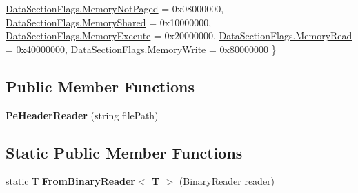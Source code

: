 \begin{DoxyCompactItemize}
\mbox{\hyperlink{class_p_e_d_scanner_lib_1_1_struct_1_1_pe_header_reader_aaa653fc9f63948e6fcdc31bc79e5aeffaf17f8f106acef3fd0ff47b8cca4de356}{Data\+Section\+Flags.\+Memory\+Not\+Paged}} = 0x08000000, 
\mbox{\hyperlink{class_p_e_d_scanner_lib_1_1_struct_1_1_pe_header_reader_aaa653fc9f63948e6fcdc31bc79e5aeffabfa33c37b72f766266c354cb6eb01d3a}{Data\+Section\+Flags.\+Memory\+Shared}} = 0x10000000, 
\mbox{\hyperlink{class_p_e_d_scanner_lib_1_1_struct_1_1_pe_header_reader_aaa653fc9f63948e6fcdc31bc79e5aeffa817041d31daef398c32f9e2efc8c482f}{Data\+Section\+Flags.\+Memory\+Execute}} = 0x20000000, 
\newline
\mbox{\hyperlink{class_p_e_d_scanner_lib_1_1_struct_1_1_pe_header_reader_aaa653fc9f63948e6fcdc31bc79e5aeffa575da5d1d4109b111267b2e044af2aad}{Data\+Section\+Flags.\+Memory\+Read}} = 0x40000000, 
\mbox{\hyperlink{class_p_e_d_scanner_lib_1_1_struct_1_1_pe_header_reader_aaa653fc9f63948e6fcdc31bc79e5aeffa5e932342aab40efaef1a503864403168}{Data\+Section\+Flags.\+Memory\+Write}} = 0x80000000
 \}
\end{DoxyCompactItemize}
\subsection*{Public Member Functions}
\begin{DoxyCompactItemize}
\item 
\mbox{\label{class_p_e_d_scanner_lib_1_1_struct_1_1_pe_header_reader_a97d98fa574c08071ed498586314d4caa}} 
{\bfseries Pe\+Header\+Reader} (string file\+Path)
\end{DoxyCompactItemize}
\subsection*{Static Public Member Functions}
\begin{DoxyCompactItemize}
\item 
\mbox{\label{class_p_e_d_scanner_lib_1_1_struct_1_1_pe_header_reader_adf4919d95e52a3ce89567a69f2081281}} 
static T {\bfseries From\+Binary\+Reader$<$ T $>$} (Binary\+Reader reader)
\end{DoxyCompactItemize}

